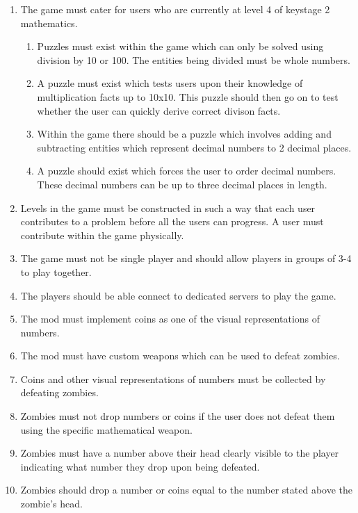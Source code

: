 \begin{enumerate}
		\item The game must cater for users who are currently at level 4 of keystage 2 mathematics.
		\begin{enumerate}[label={3.\arabic*},nolistsep,leftmargin=*]
			\item Puzzles must exist within the game which can only be solved using division by 10 or 100. The entities being divided must be whole numbers.
			\item A puzzle must exist which tests users upon their knowledge of multiplication facts up to 10x10. This puzzle should then go on to test whether the user can quickly derive correct divison facts.
			\item Within the game there should be a puzzle which involves adding and subtracting entities which represent decimal numbers to 2 decimal places.
			\item A puzzle should exist which forces the user to order decimal numbers. These decimal numbers can be up to three decimal places in length.
		\end{enumerate}
		
	\item Levels in the game must be constructed in such a way that each user contributes to a problem before all the users can progress. A user must contribute within the game physically.
	\item The game must not be single player and should allow players in groups of 3-4 to play together.
	\item The players should be able connect to dedicated servers to play the game.
	
	\item The mod must implement coins as one of the visual representations of numbers.
	
	\item The mod must have custom weapons which can be used to defeat zombies.
	
	\item Coins and other visual representations of numbers must be collected by defeating zombies.
	
	\item Zombies must not drop numbers or coins if the user does not defeat them using the specific mathematical weapon.
	
	\item Zombies must have a number above their head clearly visible to the player indicating what number they drop upon being defeated.
	
	\item Zombies should drop a number or coins equal to the number stated above the zombie's head.
	

\end{enumerate}

